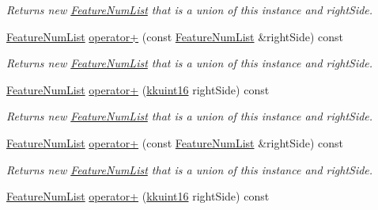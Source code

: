 \begin{DoxyCompactItemize}
\begin{DoxyCompactList}\small\item\em Returns new \hyperlink{class_k_k_m_l_l_1_1_feature_num_list}{Feature\+Num\+List} that is a union of this instance and \textquotesingle{}right\+Side\textquotesingle{}. \end{DoxyCompactList}\item 
\hyperlink{class_k_k_m_l_l_1_1_feature_num_list}{Feature\+Num\+List} \hyperlink{class_k_k_m_l_l_1_1_feature_num_list_a22ec7cf3dcfcc4b3bc2b8e82ddd84ebe}{operator+} (const \hyperlink{class_k_k_m_l_l_1_1_feature_num_list}{Feature\+Num\+List} \&right\+Side) const 
\begin{DoxyCompactList}\small\item\em Returns new \hyperlink{class_k_k_m_l_l_1_1_feature_num_list}{Feature\+Num\+List} that is a union of this instance and \textquotesingle{}right\+Side\textquotesingle{}. \end{DoxyCompactList}\item 
\hyperlink{class_k_k_m_l_l_1_1_feature_num_list}{Feature\+Num\+List} \hyperlink{class_k_k_m_l_l_1_1_feature_num_list_ad1b613a6f4c5b1c342d2a4abe76032bb}{operator+} (\hyperlink{namespace_k_k_b_aa8c7d4d30381c8a0b6fce68974a9c8a9}{kkuint16} right\+Side) const 
\begin{DoxyCompactList}\small\item\em Returns new \hyperlink{class_k_k_m_l_l_1_1_feature_num_list}{Feature\+Num\+List} that is a union of this instance and \textquotesingle{}right\+Side\textquotesingle{}. \end{DoxyCompactList}\item 
\hyperlink{class_k_k_m_l_l_1_1_feature_num_list}{Feature\+Num\+List} \hyperlink{class_k_k_m_l_l_1_1_feature_num_list_a22ec7cf3dcfcc4b3bc2b8e82ddd84ebe}{operator+} (const \hyperlink{class_k_k_m_l_l_1_1_feature_num_list}{Feature\+Num\+List} \&right\+Side) const 
\begin{DoxyCompactList}\small\item\em Returns new \hyperlink{class_k_k_m_l_l_1_1_feature_num_list}{Feature\+Num\+List} that is a union of this instance and \textquotesingle{}right\+Side\textquotesingle{}. \end{DoxyCompactList}\item 
\hyperlink{class_k_k_m_l_l_1_1_feature_num_list}{Feature\+Num\+List} \hyperlink{class_k_k_m_l_l_1_1_feature_num_list_ad1b613a6f4c5b1c342d2a4abe76032bb}{operator+} (\hyperlink{namespace_k_k_b_aa8c7d4d30381c8a0b6fce68974a9c8a9}{kkuint16} right\+Side) const 

\end{DoxyCompactItemize}

